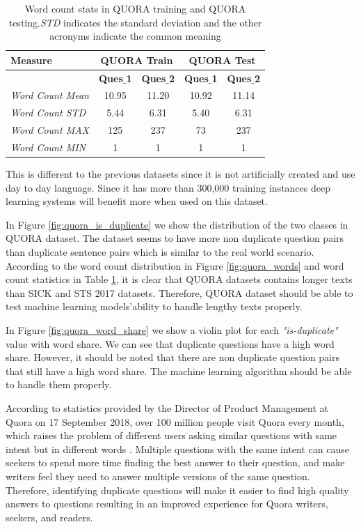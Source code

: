 \begin{enumerate}
\begin{table}
	\centering
	\begin{tabular}{l|cc|cc}
		\hline
		Measure   & \multicolumn{2}{c|}{QUORA Train} & \multicolumn{2}{c}{QUORA Test} \\
		\hline
		\multicolumn{1}{l|}{} & \textbf{Ques$\_$1} & \textbf{Ques$\_$2} & \textbf{Ques$\_$1} & \textbf{Ques$\_$2} \\
		\textit{Word Count Mean} & 10.95 & 11.20 & 10.92 & 11.14  \\
		\textit{Word Count STD} & 5.44 & 6.31 & 5.40 & 6.31  \\
		\textit{Word Count MAX} & 125 & 237 & 73 & 237  \\
		\textit{Word Count MIN} & 1 & 1 & 1 & 1  \\
		\hline
	\end{tabular}
	\caption[Word count stats in QUORA]{Word count stats in QUORA training and QUORA testing.\textit{STD} indicates the standard deviation and the other acronyms indicate the common meaning }
	\label{table:quora_sts}
\end{table}
 
  
This is different to the previous datasets since it is not artificially created and use day to day language. Since it has more than 300,000 training instances deep learning systems will benefit more when used on this dataset. 

In Figure \ref{fig:quora_is_duplicate} we show the distribution of the two classes in QUORA dataset. The dataset seems to have more non duplicate question pairs than duplicate sentence pairs which is similar to the real world scenario. According to the word count distribution in Figure \ref{fig:quora_words} and word count statistics in Table \ref{table:quora_sts}, it is clear that QUORA datasets contains longer texts than SICK and STS 2017 datasets. Therefore, QUORA dataset should be able to test machine learning models'ability to handle lengthy texts properly. 

In Figure \ref{fig:quora_word_share} we show a violin plot for each \textit{"is-duplicate"} value with word share. We can see that duplicate questions have a high word share. However, it should be noted that there are non duplicate question pairs that still have a high word share. The machine learning algorithm should be able to handle them properly. 

According to statistics provided by the Director of Product Management at Quora on 17 September 2018, over 100 million people visit Quora every month, which raises the problem of different users asking similar questions with same intent but in different words \cite{8967103}. Multiple questions with the same intent can cause seekers to spend more time finding the best answer to their question, and make writers feel they need to answer multiple versions of the same question. Therefore, identifying duplicate questions will make it easier to find high quality answers to questions resulting in an improved experience for Quora writers, seekers, and readers.


\end{enumerate}

